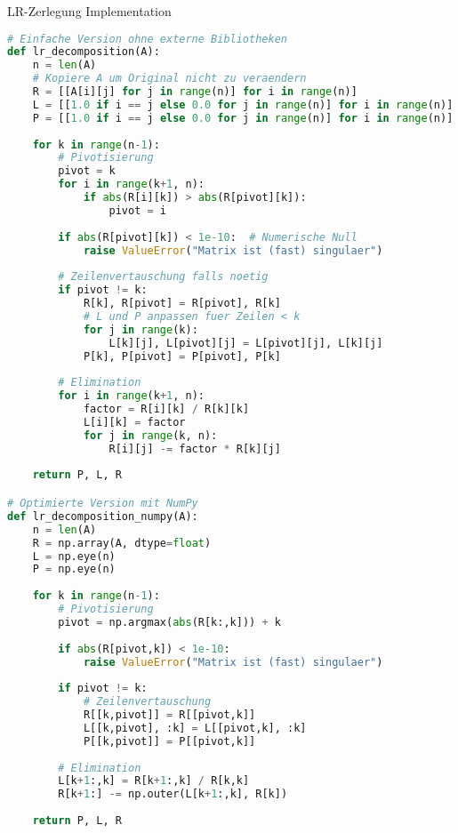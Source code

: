 \begin{examplecode}{LR-Zerlegung Implementation}
\begin{lstlisting}[language=Python, style=basesmol]
# Einfache Version ohne externe Bibliotheken
def lr_decomposition(A):
    n = len(A)
    # Kopiere A um Original nicht zu veraendern
    R = [[A[i][j] for j in range(n)] for i in range(n)]
    L = [[1.0 if i == j else 0.0 for j in range(n)] for i in range(n)]
    P = [[1.0 if i == j else 0.0 for j in range(n)] for i in range(n)]
    
    for k in range(n-1):
        # Pivotisierung
        pivot = k
        for i in range(k+1, n):
            if abs(R[i][k]) > abs(R[pivot][k]):
                pivot = i
        
        if abs(R[pivot][k]) < 1e-10:  # Numerische Null
            raise ValueError("Matrix ist (fast) singulaer")
            
        # Zeilenvertauschung falls noetig
        if pivot != k:
            R[k], R[pivot] = R[pivot], R[k]
            # L und P anpassen fuer Zeilen < k
            for j in range(k):
                L[k][j], L[pivot][j] = L[pivot][j], L[k][j]
            P[k], P[pivot] = P[pivot], P[k]
            
        # Elimination
        for i in range(k+1, n):
            factor = R[i][k] / R[k][k]
            L[i][k] = factor
            for j in range(k, n):
                R[i][j] -= factor * R[k][j]
                
    return P, L, R

# Optimierte Version mit NumPy
def lr_decomposition_numpy(A):
    n = len(A)
    R = np.array(A, dtype=float)
    L = np.eye(n)
    P = np.eye(n)
    
    for k in range(n-1):
        # Pivotisierung
        pivot = np.argmax(abs(R[k:,k])) + k
        
        if abs(R[pivot,k]) < 1e-10:
            raise ValueError("Matrix ist (fast) singulaer")
            
        if pivot != k:
            # Zeilenvertauschung
            R[[k,pivot]] = R[[pivot,k]]
            L[[k,pivot], :k] = L[[pivot,k], :k]
            P[[k,pivot]] = P[[pivot,k]]
            
        # Elimination
        L[k+1:,k] = R[k+1:,k] / R[k,k]
        R[k+1:] -= np.outer(L[k+1:,k], R[k])
        
    return P, L, R
\end{lstlisting}
\end{examplecode}

